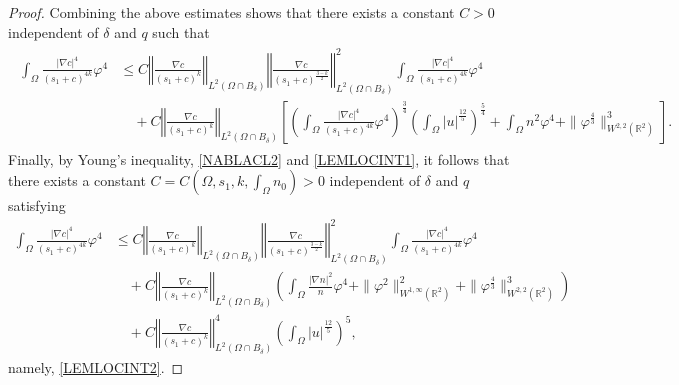 \documentclass[10pt,a4paper]{amsart}
\newcommand{\R}{{ \mathbb{R}  }}
\newcommand{\bke}[1]{\left( #1 \right)}
\newcommand{\bkt}[1]{\left[ #1 \right]}
\newcommand{\norm}[1]{\left\Vert #1 \right\Vert}
\begin{document}
\begin{proof}
Combining the above estimates
shows that there exists a constant $C>0$ independent of $\delta$ and $q$ such that
\begin{align*}
\begin{aligned}
 \int_{\Omega}\frac{|\nabla c|^{4}}{(s_{1}+c)^{4k}}\varphi^{4} 
 & \le  C\norm{\frac{\nabla c}{(s_{1}+c)^{k}}}_{L^{2}(\Omega\cap B_{\delta})} \norm{\frac{\nabla c}{(s_{1}+c)^{\frac{3-k}{2}}}}_{L^{2}(\Omega\cap B_{\delta})}^{2}  \int_{\Omega} \frac{|\nabla c|^{4}}{(s_{1}+c)^{4k}}\varphi^{4}
 \\ & \quad +
  C \norm{\frac{\nabla c}{(s_{1}+c)^{k}}}_{L^{2}(\Omega\cap B_{\delta})}   \bkt{ \bke{\int_{\Omega} \frac{|\nabla c|^{4}}{(s_{1}+c)^{4k}}\varphi^{4}}^{\frac{3}{4}}\bke{\int_{\Omega}|u|^{\frac{12}{5}} }^{\frac{5}{4}} + \int_{\Omega}n^{2}\varphi^{4}  +\|\varphi^{\frac{4}{3}}\|_{W^{2,2}(\R^{2})}^{3}}.
\end{aligned}
\end{align*}
Finally, by Young's inequality, \eqref{NABLACL2} and   \eqref{LEMLOCINT1}, it follows that there exists a constant $C=C(\Omega, s_1, k, \int_{\Omega}n_0)>0$ independent of $\delta$ and $q$ satisfying
\[
\begin{aligned}
  \int_{\Omega}\frac{|\nabla c|^{4}}{(s_{1}+c)^{4k}}\varphi^{4} 
 &  \le C\norm{\frac{\nabla c}{(s_{1}+c)^{k}}}_{L^{2}(\Omega\cap B_{\delta})} \norm{\frac{\nabla c}{(s_{1}+c)^{\frac{3-k}{2}}}}_{L^{2}(\Omega\cap B_{\delta})}^{2}  \int_{\Omega} \frac{|\nabla c|^{4}}{(s_{1}+c)^{4k}}\varphi^{4}
 \\&\quad  +   C \norm{\frac{\nabla c}{(s_{1}+c)^{k}}}_{L^{2}(\Omega\cap B_{\delta})}     \bke{  \int_{\Omega} \frac{|\nabla n|^{2}}{n}\varphi^{4}  +\| \varphi^{2}  \|_{W^{1,\infty}(\R^{2})}^{2}  +\|\varphi^{\frac{4}{3}}\|_{W^{2,2}(\R^{2})}^{3}}
 \\&\quad + C \norm{\frac{\nabla c}{(s_{1}+c)^{k}}}^{4}_{L^{2}(\Omega\cap B_{\delta})} \bke{\int_{\Omega}|u|^{\frac{12}{5}} }^{5},
 \end{aligned}
\]
namely, \eqref{LEMLOCINT2}.
\end{proof}
\end{document}
